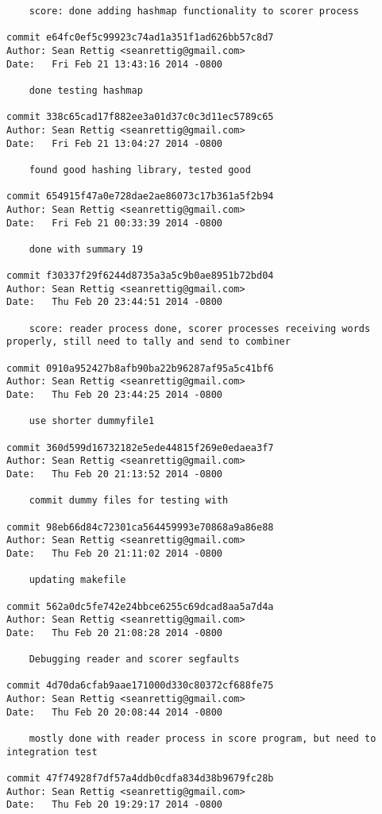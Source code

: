 \documentclass[letterpaper,10pt,fleqn]{article}
\numberwithin{equation}{section}
\begin{document}
\begin{verbatim}
    score: done adding hashmap functionality to scorer process

commit e64fc0ef5c99923c74ad1a351f1ad626bb57c8d7
Author: Sean Rettig <seanrettig@gmail.com>
Date:   Fri Feb 21 13:43:16 2014 -0800

    done testing hashmap

commit 338c65cad17f882ee3a01d37c0c3d11ec5789c65
Author: Sean Rettig <seanrettig@gmail.com>
Date:   Fri Feb 21 13:04:27 2014 -0800

    found good hashing library, tested good

commit 654915f47a0e728dae2ae86073c17b361a5f2b94
Author: Sean Rettig <seanrettig@gmail.com>
Date:   Fri Feb 21 00:33:39 2014 -0800

    done with summary 19

commit f30337f29f6244d8735a3a5c9b0ae8951b72bd04
Author: Sean Rettig <seanrettig@gmail.com>
Date:   Thu Feb 20 23:44:51 2014 -0800

    score: reader process done, scorer processes receiving words properly, still need to tally and send to combiner

commit 0910a952427b8afb90ba22b96287af95a5c41bf6
Author: Sean Rettig <seanrettig@gmail.com>
Date:   Thu Feb 20 23:44:25 2014 -0800

    use shorter dummyfile1

commit 360d599d16732182e5ede44815f269e0edaea3f7
Author: Sean Rettig <seanrettig@gmail.com>
Date:   Thu Feb 20 21:13:52 2014 -0800

    commit dummy files for testing with

commit 98eb66d84c72301ca564459993e70868a9a86e88
Author: Sean Rettig <seanrettig@gmail.com>
Date:   Thu Feb 20 21:11:02 2014 -0800

    updating makefile

commit 562a0dc5fe742e24bbce6255c69dcad8aa5a7d4a
Author: Sean Rettig <seanrettig@gmail.com>
Date:   Thu Feb 20 21:08:28 2014 -0800

    Debugging reader and scorer segfaults

commit 4d70da6cfab9aae171000d330c80372cf688fe75
Author: Sean Rettig <seanrettig@gmail.com>
Date:   Thu Feb 20 20:08:44 2014 -0800

    mostly done with reader process in score program, but need to integration test

commit 47f74928f7df57a4ddb0cdfa834d38b9679fc28b
Author: Sean Rettig <seanrettig@gmail.com>
Date:   Thu Feb 20 19:29:17 2014 -0800


\end{verbatim}
\end{document}
